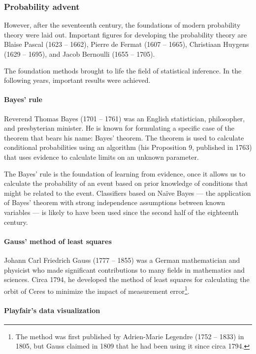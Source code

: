 \subsubsection{Probability advent}

However, after the seventeenth century, the foundations of modern probability theory were
laid out.  Important figures for developing the probability theory are Blaise Pascal (1623
-- 1662), Pierre de Fermat (1607 -- 1665), Christiaan Huygens (1629 -- 1695), and Jacob
Bernoulli (1655 -- 1705).

The foundation methods brought to life the field of statistical inference. In the
following years, important results were achieved.

\paragraph{Bayes' rule}

Reverend Thomas Bayes (1701 -- 1761) was an English statistician, philosopher, and
presbyterian minister.  He is known for formulating a specific case of the theorem that
bears his name: Bayes' theorem.  The theorem is used to calculate conditional
probabilities using an algorithm (his Proposition 9, published in 1763) that uses evidence to calculate
limits on an unknown parameter.

The Bayes' rule is the foundation of learning from evidence, once it allows us to
calculate the probability of an event based on prior knowledge of conditions that might be
related to the event.  Classifiers based on Naïve Bayes --- the application of Bayes'
theorem with strong independence assumptions between known variables --- is likely to have
been used since the second half of the eighteenth century.

\paragraph{Gauss' method of least squares}

Johann Carl Friedrich Gauss (1777 -- 1855) was a German mathematician and physicist who made
significant contributions to many fields in mathematics and sciences.  Circa 1794, he
developed the method of least squares for calculating the orbit of Ceres to minimize the
impact of measurement error\footnote{The method was first published by Adrien-Marie
Legendre (1752 -- 1833) in 1805, but Gauss claimed in 1809 that he
had been using it since circa 1794.}.

\paragraph{Playfair's data visualization}

